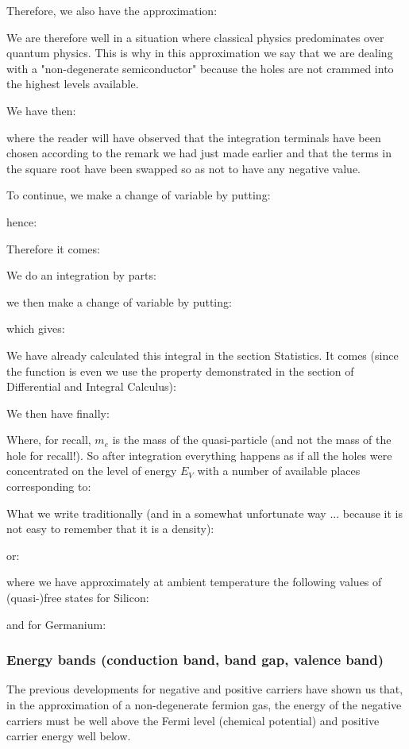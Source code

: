 	Therefore, we also have the approximation:
	
	We are therefore well in a situation where classical physics predominates over quantum physics. This is why in this approximation we say that we are dealing with a "non-degenerate semiconductor" because the holes are not crammed into the highest levels available.

	We have then:
	
	where the reader will have observed that the integration terminals have been chosen according to the remark we had just made earlier and that the terms in the square root have been swapped so as not to have any negative value.

	To continue, we make a change of variable by putting:
	
	hence:
	
	Therefore it comes:
	
	We do an integration by parts:
	
	we then make a change of variable by putting:
	
	which gives:
	
	We have already calculated this integral in the section Statistics. It comes (since the function is even we use the property demonstrated in the section of Differential and Integral Calculus):
	
	We then have finally:
	
	Where, for recall, $m_e$ is the mass of the quasi-particle (and not the mass of the hole for recall!). So after integration everything happens as if all the holes were concentrated on the level of energy $E_V$ with a number of available places corresponding to:
	
	What we write traditionally (and in a somewhat unfortunate way ... because it is not easy to remember that it is a density):
	
	or:
	
	where we have approximately at ambient temperature the following values of (quasi-)free states for Silicon:
	
	and for Germanium:
	
	
	\subsubsection{Energy bands (conduction band, band gap, valence band)}
	The previous developments for negative and positive carriers have shown us that, in the approximation of a non-degenerate fermion gas, the energy of the negative carriers must be well above the Fermi level (chemical potential) and positive carrier energy well below.

